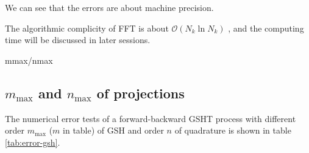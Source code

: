 We can see that the errors are about machine precision. 

The algorithmic complicity of FFT is about $\mathcal{O}(N_{k}\ln N_{k})$
\textcolor{red}{\scriptsize{}\citep{Numerical_Recipes_3ed} }, and
the computing time will be discussed in later sessions.

mmax/nmax


\subsection{$m_{\mathrm{max}}$ and $n_{\mathrm{max}}$ of projections}

The numerical error tests of a forward-backward GSHT process with
different order $m_{\mathrm{max}}$ ($m$ in table) of GSH and order
$n$ of quadrature is shown in table \ref{tab:error-gsh}.
\begin{table}[h]
\begin{centering}
\end{centering}
\end{table}
